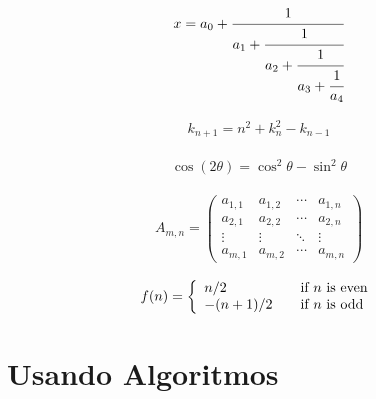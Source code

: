 \lipsum[2]

	\begin{equation}
		\begin{aligned}
			x = a_0 + \cfrac{1}{a_1
				+ \cfrac{1}{a_2
					+ \cfrac{1}{a_3 + \cfrac{1}{a_4} } } }
		\end{aligned}
	\end{equation}

\lipsum[3]

	\begin{equation}
		\begin{aligned}
			k_{n+1} = n^2 + k_n^2 - k_{n-1}
		\end{aligned}
	\end{equation}

\lipsum[4]

	\begin{equation}
		\begin{aligned}
			\cos (2\theta) = \cos^2 \theta - \sin^2 \theta
		\end{aligned}
	\end{equation}
	
\lipsum[5]

	\begin{equation}
		\begin{aligned}
			A_{m,n} =
			\begin{pmatrix}
			a_{1,1} & a_{1,2} & \cdots & a_{1,n} \\
			a_{2,1} & a_{2,2} & \cdots & a_{2,n} \\
			\vdots  & \vdots  & \ddots & \vdots  \\
			a_{m,1} & a_{m,2} & \cdots & a_{m,n}
			\end{pmatrix}
		\end{aligned}
	\end{equation}

\lipsum[6]

	\begin{equation}
		\begin{aligned}
			f(n) = \left\{ 
			\begin{array}{l l}
			n/2 & \quad \text{if $n$ is even}\\
			-(n+1)/2 & \quad \text{if $n$ is odd}
			\end{array} \right.
		\end{aligned}
	\end{equation}
	
\lipsum[7]

\section{Usando Algoritmos}

